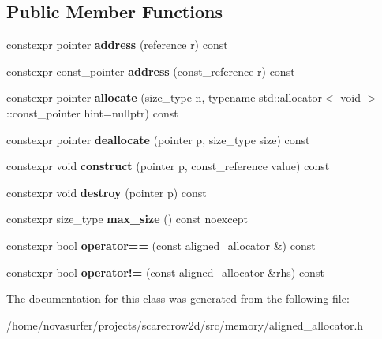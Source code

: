 \subsection*{Public Member Functions}
\begin{DoxyCompactItemize}
\item 
\mbox{\label{classsc2d_1_1memory_1_1aligned__allocator_aa4f82a600ea6ce5a4ffc18003552236e}} 
constexpr pointer {\bfseries address} (reference r) const
\item 
\mbox{\label{classsc2d_1_1memory_1_1aligned__allocator_a3f58fa762584bf3f7b15b16680357949}} 
constexpr const\+\_\+pointer {\bfseries address} (const\+\_\+reference r) const
\item 
\mbox{\label{classsc2d_1_1memory_1_1aligned__allocator_a1d8f8fb1805d7bc377229988603a6290}} 
constexpr pointer {\bfseries allocate} (size\+\_\+type n, typename std\+::allocator$<$ void $>$\+::const\+\_\+pointer hint=nullptr) const
\item 
\mbox{\label{classsc2d_1_1memory_1_1aligned__allocator_acb35494007514a0f7c20f75b572d6dd3}} 
constexpr pointer {\bfseries deallocate} (pointer p, size\+\_\+type size) const
\item 
\mbox{\label{classsc2d_1_1memory_1_1aligned__allocator_aff7dc7874e2184761af3dcbfac027cf3}} 
constexpr void {\bfseries construct} (pointer p, const\+\_\+reference value) const
\item 
\mbox{\label{classsc2d_1_1memory_1_1aligned__allocator_a3e471bbd1e62b8f18780fe4cb6dd5ceb}} 
constexpr void {\bfseries destroy} (pointer p) const
\item 
\mbox{\label{classsc2d_1_1memory_1_1aligned__allocator_ad4eff1fd881e2165a00eb7c453d7ecf4}} 
constexpr size\+\_\+type {\bfseries max\+\_\+size} () const noexcept
\item 
\mbox{\label{classsc2d_1_1memory_1_1aligned__allocator_a4302236c69dfdbcb5c15668dac281bb9}} 
constexpr bool {\bfseries operator==} (const \hyperlink{classsc2d_1_1memory_1_1aligned__allocator}{aligned\+\_\+allocator} \&) const
\item 
\mbox{\label{classsc2d_1_1memory_1_1aligned__allocator_a48f93caeb57d9216ebc88f3be87a7ff6}} 
constexpr bool {\bfseries operator!=} (const \hyperlink{classsc2d_1_1memory_1_1aligned__allocator}{aligned\+\_\+allocator} \&rhs) const
\end{DoxyCompactItemize}


The documentation for this class was generated from the following file\+:\begin{DoxyCompactItemize}
\item 
/home/novasurfer/projects/scarecrow2d/src/memory/aligned\+\_\+allocator.\+h\end{DoxyCompactItemize}
